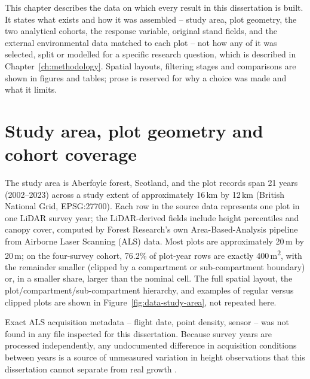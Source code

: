 This chapter describes the data on which every result in this dissertation is built. It states
what exists and how it was assembled -- study area, plot geometry, the two analytical cohorts, the
response variable, original stand fields, and the external environmental data matched to each plot
-- not how any of it was selected, split or modelled for a specific research question, which is
described in Chapter~\ref{ch:methodology}. Spatial layouts, filtering stages and comparisons are
shown in figures and tables; prose is reserved for why a choice was made and what it limits.

\section{Study area, plot geometry and cohort coverage}
\label{sec:data-source}

The study area is Aberfoyle forest, Scotland, and the plot records span 21 years (2002--2023)
across a study extent of approximately 16\,km by 12\,km (British National Grid, EPSG:27700). Each
row in the source data represents one plot in one LiDAR survey year; the LiDAR-derived fields
include height percentiles and canopy cover, computed by Forest Research's own Area-Based-Analysis
pipeline from Airborne Laser Scanning (ALS) data. Most plots are approximately 20\,m by 20\,m; on
the four-survey cohort, 76.2\% of plot-year rows are exactly 400\,m\textsuperscript{2}, with the
remainder smaller (clipped by a compartment or sub-compartment boundary) or, in a smaller share,
larger than the nominal cell.  The
full spatial layout, the plot/compartment/sub-compartment hierarchy, and examples of regular versus
clipped plots are shown in Figure~\ref{fig:data-study-area}, not repeated here.

Exact ALS acquisition metadata -- flight date, point density, sensor -- was not found in any file
inspected for this dissertation. Because survey years are processed independently, any undocumented
difference in acquisition conditions between years is a source of unmeasured variation in height
observations that this dissertation cannot separate from real growth .

